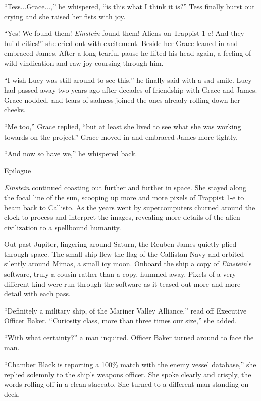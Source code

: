 \documentclass[12pt]{article} %
\begin{document}
``Tess...Grace...,'' he whispered, ``is this what I think it is?'' Tess finally burst out crying and she raised her fists with joy.

``Yes! We found them! \textit{Einstein} found them! Aliens on Trappist 1-e! And they build cities!'' she cried out with excitement. Beside her Grace leaned in and embraced James. After a long tearful pause he lifted his head again, a feeling of wild vindication and raw joy coursing through him.

``I wish Lucy was still around to see this,'' he finally said with a sad smile. Lucy had passed away two years ago after decades of friendship with Grace and James. Grace nodded, and tears of sadness joined the ones already rolling down her cheeks.

``Me too,'' Grace replied, ``but at least she lived to see what she was working towards on the project.'' Grace moved in and embraced James more tightly.

``And now so have we,'' he whispered back.


Epilogue

\textit{Einstein} continued coasting out further and further in space. She stayed along the focal line of the sun, scooping up more and more pixels of Trappist 1-e to beam back to Callisto. As the years went by supercomputers churned around the clock to process and interpret the images, revealing more details of the alien civilization to a spellbound humanity.

Out past Jupiter, lingering around Saturn, the Reuben James quietly plied through space. The small ship flew the flag of the Callistan Navy and orbited silently around Mimas, a small icy moon. Onboard the ship a copy of \textit{Einstein}'s software, truly a cousin rather than a copy, hummed away. Pixels of a very different kind were run through the software as it teased out more and more detail with each pass.

``Definitely a military ship, of the Mariner Valley Alliance,'' read off Executive Officer Baker. ``Curiosity class, more than three times our size,'' she added.

``With what certainty?'' a man inquired. Officer Baker turned around to face the man.

``Chamber Black is reporting a 100\% match with the enemy vessel database,'' she replied solemnly to the ship's weapons officer. She spoke clearly and crisply, the words rolling off in a clean staccato. She turned to a different man standing on deck.
\end{document}
